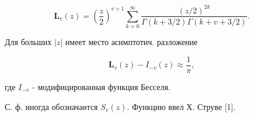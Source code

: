 \documentclass[10pt]{article}
\begin{document}
\[

\mathbf{L}_{v}(z)=\left(\frac{z}{2}\right)^{v+1} \sum_{k=0}^{\infty} \frac{(z / 2)^{2 k}}{\Gamma(k+3 / 2) \Gamma(k+v+3 / 2)} .

\]



Для больших $|z|$ имеет место асимптотич. разложение



\[

\mathbf{L}_{v}(z)-I_{-v}(z) \approx \frac{1}{\pi},

\]



где $I_{-v}$ - модифицированная функция Бесселя.



С. ф. иногда обозначаөтся $S_{v}(z)$. Функцию ввел Х. Струве [1].
\end{document}
